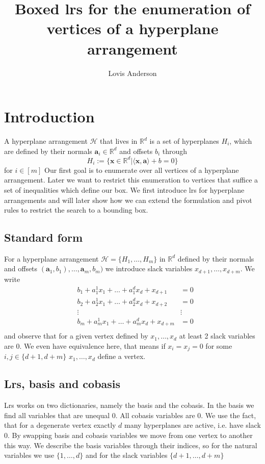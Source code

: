 \documentclass[]{article}
\title{Boxed lrs for the enumeration of vertices of a hyperplane arrangement}
\author{Lovis Anderson}
\theoremstyle{definition}
\theoremstyle{remark}
\begin{document}
\maketitle

\begin{abstract}

\end{abstract}
\section{Introduction}
A hyperplane arrangement $\mathcal{H}$ that lives in $\mathbb{R}^d$ is a set of hyperplanes $H_i$, which are defined by their normals $\bm{a}_i \in \mathbb{R}^d$ and offsets $b_i$ through 
$$H_i := \{\bm{x} \in \mathbb{R}^d \vert \langle \bm{x}, \bm{a} \rangle + b = 0 \}$$
 for $i \in [m]$ Our first goal is to enumerate over all vertices of a hyperplane arrangement. Later we want to restrict this enumeration to vertices that suffice a set of inequalities which define our box. We first introduce lrs for hyperplane arrangements and will later show how we can extend the formulation and pivot rules to restrict the search to a bounding box.
\subsection{Standard form}
For a hyperplane arrangement $\mathcal{H} = \{H_1, \dots , H_m\}$ in $\mathbb{R}^d$ defined by their normals and offsets $(\bm{a}_1, b_1), \dots,  \bm{a}_m, b_m)$ we introduce slack variables $x_{d+1}, \dots , x_{d+m}$. We write
\begin{align*}
&b_1+ a_1^1x_1 +	\dots	 +a_1^d x_d +  x_{d+1}	& = 0 \\
&b_2+ a_2^1x_1 +	\dots	 +a_2^d x_d +  x_{d+2} 	&= 0 \\
&\vdots 		 				 					&\vdots \\
&b_m+ a_m^1x_1 +	\dots	 +a_m^d x_d +  x_{d+m} 	&= 0 \\
\end{align*}
and observe that for a given vertex defined by $x_1, \dots, x_d$ at least 2 slack variables are $0$. We even have equivalence here, that means if $x_i = x_j = 0$ for some $i,j \in \{d+1, d+m\}$ $x_1, \dots, x_d$ define a vertex.
\subsection{Lrs, basis and cobasis}
Lrs works on two dictionaries, namely the basis and the cobasis. In the basis we find all variables that are unequal $0$. All cobasis variables are $0$. We use the fact, that for a degenerate vertex exactly $d$ many hyperplanes are active, i.e. have slack $0$. By swapping basis and cobasis variables we move from one vertex to another this way. We describe the basis variables through their indices, so for the natural variables we use $\{1, \dots, d\}$ and for the slack variables $\{d+1, \dots, d+m\}$
\end{document}
